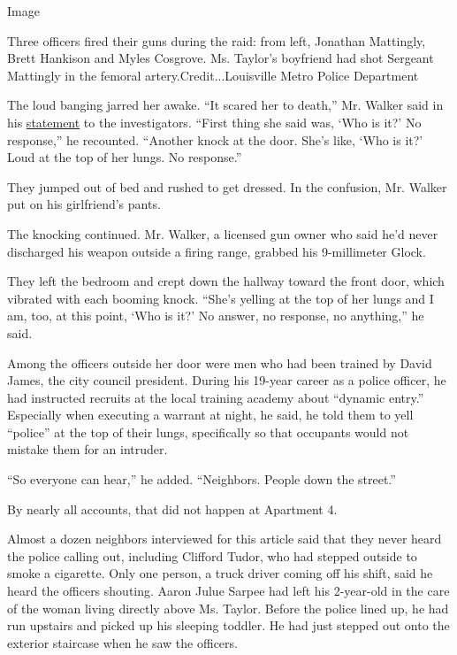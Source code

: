 Image

Three officers fired their guns during the raid: from left, Jonathan
Mattingly, Brett Hankison and Myles Cosgrove. Ms. Taylor's boyfriend had
shot Sergeant Mattingly in the femoral artery.Credit...Louisville Metro
Police Department

The loud banging jarred her awake. ``It scared her to death,'' Mr.
Walker said in his
\href{https://www.nbcnews.com/video/new-audio-of-breonna-taylor-s-boyfriend-sheds-light-on-police-investigation-into-her-death-87241797969}{statement}
to the investigators. ``First thing she said was, `Who is it?' No
response,'' he recounted. ``Another knock at the door. She's like, `Who
is it?' Loud at the top of her lungs. No response.''

They jumped out of bed and rushed to get dressed. In the confusion, Mr.
Walker put on his girlfriend's pants.

The knocking continued. Mr. Walker, a licensed gun owner who said he'd
never discharged his weapon outside a firing range, grabbed his
9-millimeter Glock.

They left the bedroom and crept down the hallway toward the front door,
which vibrated with each booming knock. ``She's yelling at the top of
her lungs and I am, too, at this point, `Who is it?' No answer, no
response, no anything,'' he said.

Among the officers outside her door were men who had been trained by
David James, the city council president. During his 19-year career as a
police officer, he had instructed recruits at the local training academy
about ``dynamic entry.'' Especially when executing a warrant at night,
he said, he told them to yell ``police'' at the top of their lungs,
specifically so that occupants would not mistake them for an intruder.

``So everyone can hear,'' he added. ``Neighbors. People down the
street.''

By nearly all accounts, that did not happen at Apartment 4.

Almost a dozen neighbors interviewed for this article said that they
never heard the police calling out, including Clifford Tudor, who had
stepped outside to smoke a cigarette. Only one person, a truck driver
coming off his shift, said he heard the officers shouting. Aaron Julue
Sarpee had left his 2-year-old in the care of the woman living directly
above Ms. Taylor. Before the police lined up, he had run upstairs and
picked up his sleeping toddler. He had just stepped out onto the
exterior staircase when he saw the officers.

